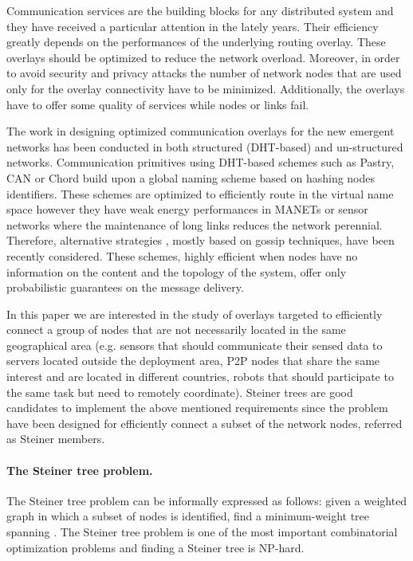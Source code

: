 \documentclass[11pt]{article}
\begin{document}
Communication services are the building blocks for any distributed
system and they have received a particular attention in the lately
years. Their efficiency greatly depends 
on the performances of the underlying routing overlay. 
These overlays should be optimized to reduce the network
overload. Moreover, in order 
to avoid security and privacy attacks the number of network nodes that
are used only for the overlay connectivity have to be minimized. Additionally, the overlays have to offer 
some quality of services while nodes or links fail.
  
The work in designing optimized communication overlays for the new emergent
networks has been conducted in both structured (DHT-based) and un-structured networks. 
Communication primitives using DHT-based schemes such as Pastry, CAN or Chord  \cite{CDCHR03} 
build upon a global naming scheme based on hashing nodes identifiers.
These schemes are optimized to efficiently route in the virtual name
space however they have weak energy performances in MANETs or
sensor networks where the maintenance of long links reduces the
network perennial. Therefore, alternative strategies \cite{KS07}, mostly based on
gossip techniques, 
have been recently considered. These schemes, highly 
efficient when nodes have no information on the content and the topology of the system,
offer only probabilistic guarantees on the message delivery.

In this paper we are interested in the study of overlays targeted 
to efficiently connect a group of nodes that are 
not necessarily located in the same geographical area (e.g. sensors that should communicate their 
sensed data to servers located outside the deployment area, P2P nodes that share the same 
interest and are located in different countries, robots that should 
participate to the same task but need to remotely coordinate). Steiner trees are good 
candidates to implement the above mentioned requirements since the problem have been 
designed for efficiently connect a subset of the network nodes, referred as Steiner members. 


\paragraph{The Steiner tree problem.}

The Steiner tree problem can be informally expressed as follows: 
given a weighted graph 
in which a subset  
of nodes 
is identified, 
find a minimum-weight tree spanning .
The Steiner tree problem is one of the most important 
combinatorial optimization problems and finding a Steiner tree is NP-hard. 
\end{document}
